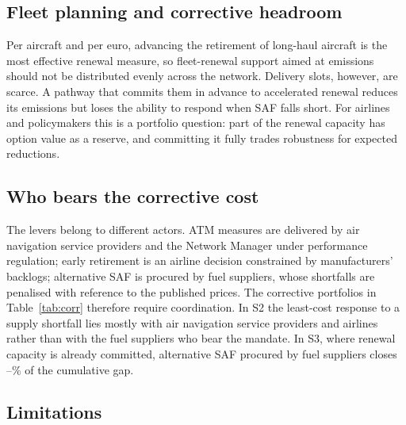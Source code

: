 \documentclass[preprint, 12pt, authoryear]{elsarticle}
\begin{document}
\subsection{Fleet planning and corrective headroom}

Per aircraft and per euro, advancing the retirement of long-haul aircraft is
the most effective renewal measure, so fleet-renewal support aimed at emissions
should not be distributed evenly across the network. Delivery slots, however,
are scarce. A pathway that commits them in advance to accelerated renewal
reduces its emissions but loses the ability to respond when SAF falls short.
For airlines and policymakers this is a portfolio question: part of the renewal
capacity has option value as a reserve, and committing it fully trades
robustness for expected reductions.

\subsection{Who bears the corrective cost}

The levers belong to different actors. ATM measures are delivered by air
navigation service providers and the Network Manager under performance
regulation; early retirement is an airline decision constrained by manufacturers'
backlogs; alternative SAF is procured by fuel suppliers, whose shortfalls are
penalised with reference to the published prices. The corrective portfolios in
Table~\ref{tab:corr} therefore require coordination. In S2 the least-cost
response to a supply shortfall lies mostly with air navigation service providers
and airlines rather than with the fuel suppliers who bear the mandate. In S3,
where renewal capacity is already committed, alternative SAF procured by fuel
suppliers closes \AltShareThreeMin--\AltShareThreeMax\% of the cumulative gap.

\subsection{Limitations}
\end{document}
